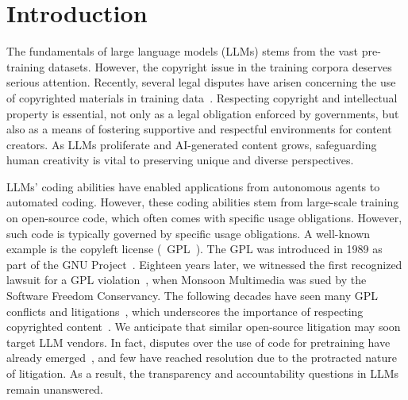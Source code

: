 
\section{Introduction}

The fundamentals of large language models (LLMs) stems from the vast pre-training datasets. However, the copyright issue in the training corpora deserves serious attention. 
Recently, several legal disputes have arisen concerning the use of copyrighted materials in training data~\cite{openaisue, newssue}. 
Respecting copyright and intellectual property is essential, not only as a legal obligation enforced by governments, but also as a means of fostering supportive and respectful environments for content creators. As LLMs proliferate and AI-generated content grows, safeguarding human creativity is vital to preserving unique and diverse perspectives.



LLMs' coding abilities have enabled applications from autonomous agents to automated coding. 
However, these coding abilities stem from large-scale training on open-source code, which often comes with specific usage obligations. However, such code is typically governed by specific usage obligations.
A well-known example is the copyleft license (\eg~GPL~\cite{gnu}). %
The GPL was introduced in 1989 as part of the GNU Project~\cite{gnu}. Eighteen years later, we witnessed the first recognized lawsuit for a GPL violation~\cite{lvcriminaldefense, Informationweek}, when Monsoon Multimedia was sued by the Software Freedom Conservancy.
The following decades have seen many GPL conflicts and litigations~\cite{gpllitigation}, which underscores the importance of respecting copyrighted content~\cite{xu2024llms}. %
We anticipate that similar open-source litigation may soon target LLM vendors.  %
In fact, disputes over the use of code for pretraining have already emerged~\cite{githubsue}, and few have reached resolution due to the protracted nature of litigation. As a result, the transparency and accountability questions in LLMs remain unanswered.



